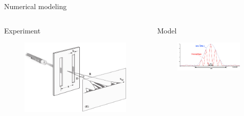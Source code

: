 \documentclass[serif ,mathserif, 8pt]{beamer}
\begin{document}
\begin{frame}{Numerical modeling}
\begin{columns}[c]
	\begin{column}{0.35\textwidth}
		\begin{block}{Experiment}
			\begin{figure}
				\includegraphics[width=\linewidth]{images/DoubleFente}
			\end{figure}
		\end{block}
		
	\end{column}
	
	\begin{column}{0.55\textwidth}
		\begin{block}{Model}
			\begin{figure}
				
				\includegraphics[width=\linewidth]{images/im2}
			\end{figure}
		\end{block}
			
	\end{column}
\end{columns}
	

\end{frame}
\end{document}

